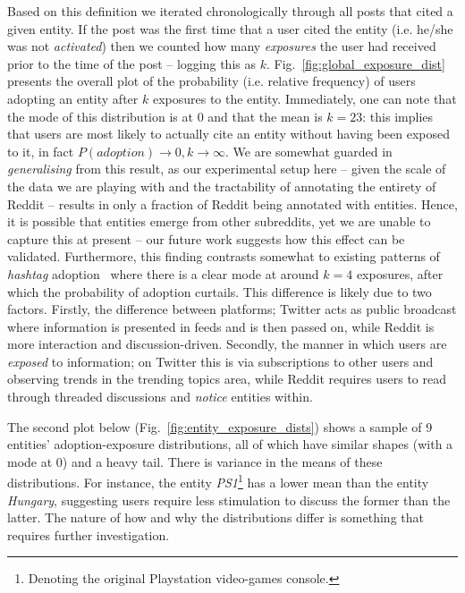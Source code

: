 \documentclass[sigconf]{acmart}
\begin{document}
Based on this definition we iterated chronologically through all posts that cited a given entity.
If the post was the first time that a user cited the entity (i.e. he/she was not \emph{activated}) then we counted how many \emph{exposures} the user had received prior to the time of the post -- logging this as $k$.
Fig.~\ref{fig:global_exposure_dist} presents the overall plot of the probability (i.e. relative frequency) of users adopting an entity after $k$ exposures to the entity.
Immediately, one can note that the mode of this distribution is at $0$ and that the mean is $k=23$: this implies that users are most likely to actually cite an entity without having been exposed to it, in fact $P(adoption) \rightarrow 0, k \rightarrow \infty$.
We are somewhat guarded in \emph{generalising} from this result, as our experimental setup here -- given the scale of the data we are playing with and the tractability of annotating the entirety of Reddit -- results in only a fraction of Reddit being annotated with entities.
Hence, it is possible that entities emerge from other subreddits, yet we are unable to capture this at present -- our future work suggests how this effect can be validated.
Furthermore, this finding contrasts somewhat to existing patterns of \emph{hashtag} adoption~\cite{romero2011differences} where there is a clear mode at around $k=4$ exposures, after which the probability of adoption curtails.
This difference is likely due to two factors.
Firstly, the difference between platforms; Twitter acts as public broadcast where information is presented in feeds and is then passed on, while Reddit is more interaction and discussion-driven.
Secondly, the manner in which users are \emph{exposed} to information; on Twitter this is via subscriptions to other users and observing trends in the trending topics area, while Reddit requires users to read through threaded discussions and \emph{notice} entities within.

The second plot below (Fig.~\ref{fig:entity_exposure_dists}) shows a sample of 9 entities' adoption-exposure distributions, all of which have similar shapes (with a mode at $0$) and a heavy tail.
There is variance in the means of these distributions.
For instance, the entity \emph{PS1}\footnote{Denoting the original Playstation video-games console.} has a lower mean than the entity \emph{Hungary}, suggesting  users require less stimulation to discuss the former than the latter.
The nature of how and why the distributions differ is something that requires further investigation.%
\end{document}
